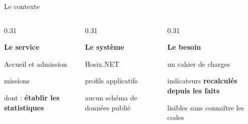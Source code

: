 \documentclass[aspectratio=169,11pt]{beamer}
\begin{document}
\begin{frame}{Le contexte}
  \vspace{2mm}
  \begin{columns}[T]
    \begin{column}{0.31\textwidth}
      {\large\bfseries\color{accentgarde}Le service\par}
      \medskip
      Accueil et admission\par
      \secondaire{\marqueurOrganismeAccueil}
      \bigskip

       missions\par
      \bigskip

      dont : \textbf{établir les statistiques}
    \end{column}
    \begin{column}{0.31\textwidth}
      {\large\bfseries\color{accentgarde}Le système\par}
      \medskip
      Hosix.NET\par
      \bigskip

       profils applicatifs
      \bigskip

      aucun schéma de données publié
    \end{column}
    \begin{column}{0.31\textwidth}
      {\large\bfseries\color{accentgarde}Le besoin\par}
      \medskip
      un cahier de charges\par
      \bigskip

      indicateurs \textbf{recalculés depuis les faits}
      \bigskip

      lisibles sans connaître les codes
    \end{column}
  \end{columns}
\end{frame}
\end{document}
